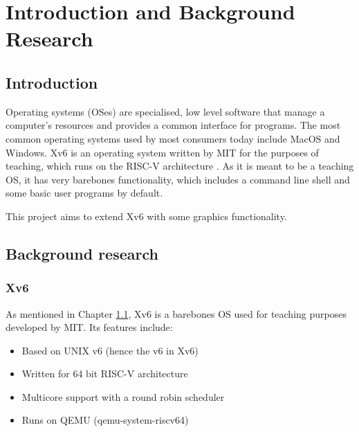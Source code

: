 \chapter{Introduction and Background Research}

\label{chapter1}

\section{Introduction}
\label{chapter1:introduction}

Operating systems (OSes) are specialised, low level software that manage a computer's
resources and provides a common interface for programs. The most common operating
systems used by most consumers today include MacOS and Windows. Xv6 is an operating
system written by MIT for the purposes of teaching, which runs on the RISC-V architecture \cite{xv6:book}\cite{xv6:code}.
As it is meant to be a teaching OS, it has very barebones functionality,
which includes a command line shell and some basic user programs by default.

This project aims to extend Xv6 with some graphics functionality.


\section{Background research}
\subsection{Xv6}
As mentioned in Chapter \ref{chapter1:introduction}, Xv6 is a barebones OS used for teaching purposes developed by MIT.
Its features include:
\begin{itemize}
    \item Based on UNIX v6 (hence the v6 in Xv6)
    \item Written for 64 bit RISC-V architecture
    \item Multicore support with a round robin scheduler
    \item Runs on QEMU (qemu-system-riscv64)
\end{itemize}

